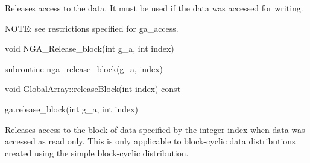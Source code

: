 \documentclass[10pt]{article}
\begin{document}
\local

\begin{desc}

Releases access to the data. It must be used if the data was accessed for
writing.

NOTE: see restrictions specified for ga_access.

\end{desc}



\begin{capi}
\begin{ccode}
void NGA_Release_block(int g_a, int index)
\end{ccode}
\begin{funcargs}
\end{funcargs}
\end{capi}

\begin{fapi}
\begin{fcode}
subroutine nga_release_block(g_a, index)
\end{fcode}
\begin{funcargs}
\end{funcargs}
\end{fapi}

\begin{cxxapi}
\begin{cxxcode}
void GlobalArray::releaseBlock(int index) const
\end{cxxcode}
\begin{funcargs}
\end{funcargs}
\end{cxxapi}

\begin{pyapi}
\begin{pycode}
ga.release_block(int g_a, int index)
\end{pycode}
\begin{funcargs}
\end{funcargs}
\end{pyapi}

\local

\begin{desc}

Releases access to the block of data specified by the integer index when data
was accessed as read only. This is only applicable to block-cyclic data
distributions created using the simple block-cyclic distribution.

\end{desc}
\end{document}
